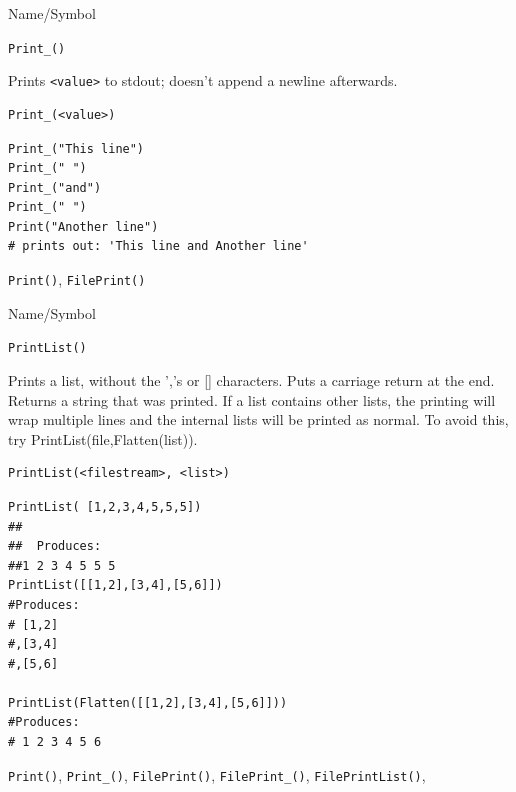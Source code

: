 \begin{desc}{Name/Symbol}
\item[Name/Symbol]	\verb+Print_()+

\item[Description]	Prints \verb+<value>+ to stdout; doesn't append a newline afterwards.

\item[Usage]		
\begin{verbatim}
Print_(<value>)
\end{verbatim}

\item[Example]	
\begin{verbatim}
Print_("This line")
Print_(" ")
Print_("and")
Print_(" ")
Print("Another line")
# prints out: 'This line and Another line'
\end{verbatim}

\item[See Also]	\verb+Print()+, \verb+FilePrint()+
\end{desc}
\begin{desc}{Name/Symbol}
\item[Name/Symbol]	\verb+PrintList()+

\item[Description]	Prints a list, without the ','s or []
  characters. Puts a carriage return at the end.  Returns a string
  that was printed.  If a list contains other lists, the printing will
  wrap multiple lines and the internal lists will be printed as
  normal.  To avoid this, try PrintList(file,Flatten(list)).

\item[Usage]
\begin{verbatim}
PrintList(<filestream>, <list>)
\end{verbatim}

\item[Example]
\begin{verbatim}
PrintList( [1,2,3,4,5,5,5])
##
##  Produces:
##1 2 3 4 5 5 5
PrintList([[1,2],[3,4],[5,6]])
#Produces:
# [1,2]
#,[3,4]
#,[5,6]

PrintList(Flatten([[1,2],[3,4],[5,6]]))
#Produces:
# 1 2 3 4 5 6

\end{verbatim}

\item[See Also]	\verb+Print()+, \verb+Print_()+, \verb+FilePrint()+, \verb+FilePrint_()+, \verb+FilePrintList()+,
\end{desc}

